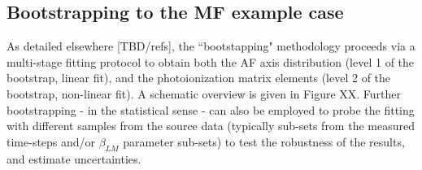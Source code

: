 \subsection{Bootstrapping to the MF example case}

As detailed elsewhere [TBD/refs], the ``bootstapping" methodology proceeds via a multi-stage fitting protocol to obtain both the AF axis distribution (level 1 of the bootstrap, linear fit), and the photoionization matrix elements (level 2 of the bootstrap, non-linear fit). A schematic overview is given in Figure XX. Further bootstrapping - in the statistical sense - can also be employed to probe the fitting with different samples from the source data (typically sub-sets from the measured time-steps and/or $\beta_{LM}$ parameter sub-sets) to test the robustness of the results, and estimate uncertainties.